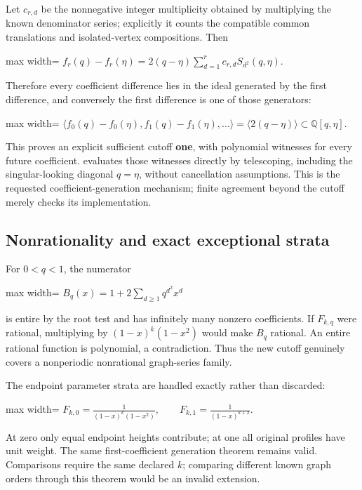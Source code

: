 \documentclass[
  11pt,
  a4paper,
]{report}
\let\singularitytexttt\texttt
\renewcommand{\texttt}[1]{\singularitytexttt{\seqsplit{#1}}}
\begin{document}
Let \(c_{r,d}\) be the nonnegative integer multiplicity obtained by
multiplying the known denominator series; explicitly it counts the
compatible common translations and isolated-vertex compositions. Then \begin{center}
\begin{adjustbox}{max width=\linewidth}
$\displaystyle
 f_r(q)-f_r(\eta)
 =2(q-\eta)\sum_{d=1}^r c_{r,d}S_{d^2}(q,\eta).
$
\end{adjustbox}
\end{center} Therefore every coefficient difference lies in the ideal generated by
the first difference, and conversely the first difference is one of
those generators: \begin{center}
\begin{adjustbox}{max width=\linewidth}
$\displaystyle
 \langle f_0(q)-f_0(\eta),f_1(q)-f_1(\eta),\ldots\rangle
 =\langle2(q-\eta)\rangle\subset\mathbb Q[q,\eta].
$
\end{adjustbox}
\end{center} This proves an explicit sufficient cutoff \textbf{one}, with
polynomial witnesses for every future coefficient.
\texttt{ideal\_difference\_quotient} evaluates those witnesses directly
by telescoping, including the singular-looking diagonal \(q=\eta\),
without cancellation assumptions. This is the requested
coefficient-generation mechanism; finite agreement beyond the cutoff
merely checks its implementation.

\hypertarget{nonrationality-and-exact-exceptional-strata}{%
\subsection{Nonrationality and exact exceptional
strata}\label{nonrationality-and-exact-exceptional-strata}}

For \(0<q<1\), the numerator \begin{center}
\begin{adjustbox}{max width=\linewidth}
$\displaystyle
 B_q(x)=1+2\sum_{d\ge1}q^{d^2}x^d
$
\end{adjustbox}
\end{center} is entire by the root test and has infinitely many nonzero
coefficients. If \(F_{k,q}\) were rational, multiplying by
\((1-x)^k(1-x^2)\) would make \(B_q\) rational. An entire rational
function is polynomial, a contradiction. Thus the new cutoff genuinely
covers a nonperiodic nonrational graph-series family.

The endpoint parameter strata are handled exactly rather than discarded:
\begin{center}
\begin{adjustbox}{max width=\linewidth}
$\displaystyle
 F_{k,0}=\frac1{(1-x)^k(1-x^2)},\qquad
 F_{k,1}=\frac1{(1-x)^{k+2}}.
$
\end{adjustbox}
\end{center} At zero only equal endpoint heights contribute; at one all original
profiles have unit weight. The same first-coefficient generation theorem
remains valid. Comparisons require the same declared \(k\); comparing
different known graph orders through this theorem would be an invalid
extension.
\end{document}
